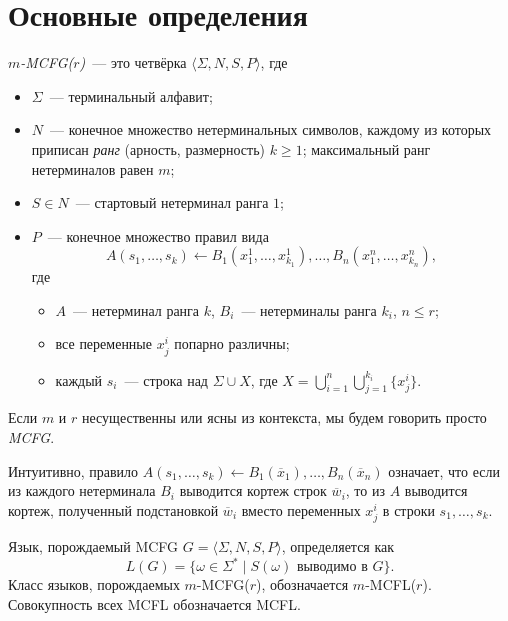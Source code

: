\section{Основные определения}
\label{sec:MCFGBasicDefinitions}

\begin{definition}
    \emph{$m$-MCFG($r$)}~--- это четвёрка $\langle \Sigma, N, S, P \rangle$, где
    \begin{itemize}
        \item $\Sigma$~--- терминальный алфавит;
        \item $N$~--- конечное множество нетерминальных символов, каждому из которых приписан \emph{ранг} (арность, размерность) $k \ge 1$;
              максимальный ранг нетерминалов равен $m$;
        \item $S \in N$~--- стартовый нетерминал ранга $1$;
        \item $P$~--- конечное множество правил вида
              \[
              A(s_1,\ldots,s_k) \leftarrow B_1(x_1^1,\ldots,x_{k_1}^1), \ldots, B_n(x_1^n,\ldots,x_{k_n}^n),
              \]
              где
              \begin{itemize}
                  \item $A$~--- нетерминал ранга $k$, $B_i$~--- нетерминалы ранга $k_i$, $n \leq r$;
                  \item все переменные $x^i_j$ попарно различны;
                  \item каждый $s_i$~--- строка над $\Sigma \cup X$, где $X = \bigcup_{i=1}^n\bigcup_{j=1}^{k_i} \{x^i_j\}$.
              \end{itemize}
    \end{itemize}
    Если $m$ и $r$ несущественны или ясны из контекста, мы будем говорить просто \emph{MCFG}.
\end{definition}

Интуитивно, правило $A(s_1,\ldots,s_k) \leftarrow B_1(\overline{x}_1),\ldots,B_n(\overline{x}_n)$ означает, что если из каждого нетерминала $B_i$ выводится кортеж строк $\overline{w}_i$, то из $A$ выводится кортеж, полученный подстановкой $\overline{w}_i$ вместо переменных $x^i_j$ в строки $s_1,\ldots,s_k$.

\begin{definition}
    Язык, порождаемый MCFG $G = \langle \Sigma, N, S, P \rangle$, определяется как
    \[
    L(G) = \{ \omega \in \Sigma^* \mid S(\omega) \text{ выводимо в } G \}.
    \]
    Класс языков, порождаемых $m$-MCFG($r$), обозначается $m$-MCFL($r$).
    Совокупность всех MCFL обозначается MCFL.
\end{definition}


